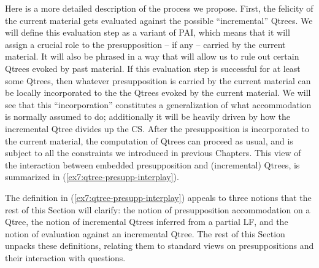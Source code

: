 Here is a more detailed description of the process we propose. First, the felicity of the current material gets evaluated against the possible ``incremental'' Qtrees. We will define this evaluation step as a variant of PAI, which means that it will assign a crucial role to the presupposition -- if any -- carried by the current material. It will also be phrased in a way that will allow us to rule out certain Qtrees evoked by past material. If this evaluation step is successful for at least some Qtrees, then whatever presupposition is carried by the current material can be locally incorporated to the the Qtrees evoked by the current material. We will see that this  ``incorporation'' constitutes a generalization of what accommodation is normally assumed to do; additionally it will be heavily driven by how the incremental Qtree divides up the CS. After the presupposition is incorporated to the current material, the computation of Qtrees can proceed as usual, and is subject to all the constraints we introduced in previous Chapters. This view of the interaction between embedded presupposition and (incremental) Qtrees, is summarized in (\ref{ex7:qtree-presupp-interplay}).

\begin{exe}
	\label{ex7:qtree-presupp-interplay}
\end{exe}

The definition in (\ref{ex7:qtree-presupp-interplay}) appeals to three notions that the rest of this Section will clarify: the notion of presupposition accommodation on a Qtree, the notion of incremental Qtrees inferred from a partial LF, and the notion of evaluation against an incremental Qtree. The rest of this Section unpacks these definitions, relating them to standard views on presuppositions and their interaction with questions.

